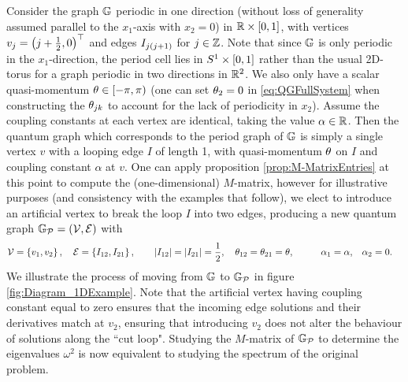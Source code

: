 Consider the graph $\mathbb{G}$ periodic in one direction (without loss of generality assumed parallel to the $x_1$-axis with $x_2=0$) in $\mathbb{R}\times\left[ 0,1 \right]$, with vertices $v_j = \left( j + \frac{1}{2}, 0 \right)^\top$ and edges $I_{j\left( j+1 \right)}$ for $j\in\mathbb{Z}$.
Note that since $\mathbb{G}$ is only periodic in the $x_1$-direction, the period cell lies in $S^1\times\left[ 0,1 \right]$ rather than the usual 2D-torus for a graph periodic in two directions in $\mathbb{R}^2$.
We also only have a scalar quasi-momentum $\theta\in\left[-\pi,\pi\right)$ (one can set $\theta_2=0$ in \eqref{eq:QGFullSystem} when constructing the $\theta_{jk}$ to account for the lack of periodicity in $x_2$).
Assume the coupling constants at each vertex are identical, taking the value $\alpha\in\mathbb{R}$.
Then the quantum graph which corresponds to the period graph of $\mathbb{G}$ is simply a single vertex $v$ with a looping edge $I$ of length 1, with quasi-momentum $\theta$ on $I$ and coupling constant $\alpha$ at $v$. 
One can apply proposition \ref{prop:M-MatrixEntries} at this point to compute the (one-dimensional) $M$-matrix, however for illustrative purposes (and consistency with the examples that follow), we elect to introduce an artificial vertex to break the loop $I$ into two edges, producing a new quantum graph $\mathbb{G}_{\mathcal{P}}=\left( \mathcal{V}, \mathcal{E} \right)$ with
\begin{align*}
	\mathcal{V} = \left\{  v_1 , v_2  \right\}, \quad \mathcal{E} = \left\{  I_{12}, I_{21}  \right\},
	&\qquad \left\lvert I_{12} \right\rvert = \left\lvert I_{21} \right\rvert = \frac{1}{2}, \quad \theta_{12} = \theta_{21} = \theta, 
	&\qquad \alpha_1 = \alpha, \quad &\alpha_2 = 0.
\end{align*}
We illustrate the process of moving from $\mathbb{G}$ to $\mathbb{G}_{\mathcal{P}}$ in figure \ref{fig:Diagram_1DExample}.
Note that the artificial vertex having coupling constant equal to zero ensures that the incoming edge solutions and their derivatives match at $v_2$, ensuring that introducing $v_2$ does not alter the behaviour of solutions along the ``cut loop".
Studying the $M$-matrix of $\mathbb{G}_{\mathcal{P}}$ to determine the eigenvalues $\omega^2$ is now equivalent to studying the spectrum of the original problem.
